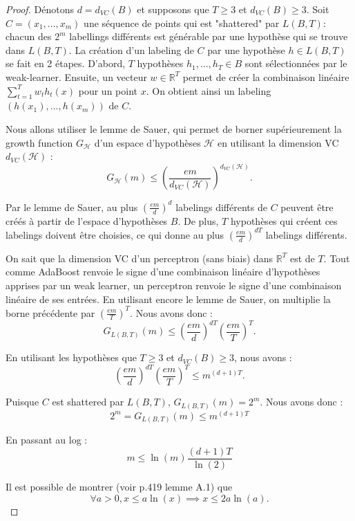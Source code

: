 \documentclass[12pt]{article}
\newcommand{\R}{\mathbb{R}}
\begin{document}
	\begin{proof}
	
	Dénotons $d = d_{VC}(B)$ et supposons que $T \geq 3$ et $d_{VC}(B) \geq 3$.
	Soit $C = (x_1, ..., x_m)$ une séquence de points qui est "shattered" par $L(B, T)$: chacun des $2^m$ labellings différents est générable par une hypothèse qui se trouve dans $L(B, T)$.
	La création d'un labeling de $C$ par une hypothèse $h \in L(B, T)$ se fait en 2 étapes.
	D'abord, $T$ hypothèses $h_1, ..., h_T \in B$ sont sélectionnées par le weak-learner.
	Ensuite, un vecteur $w \in \R^T$ permet de créer la combinaison linéaire $\sum_{t=1}^T w_t h_t(x)$ pour un point $x$.
	On obtient ainsi un labeling $(h(x_1), ..., h(x_m))$ de $C$.
	
	Nous allons utiliser le lemme de Sauer, qui permet de borner supérieurement la growth function $G_{\mathcal{H}}$ d'un espace d'hypothèses $\mathcal{H}$ en utilisant la dimension VC $d_{VC}(\mathcal{H})$ :
	\[
	G_{\mathcal{H}}(m) \leq \left( \frac{em}{d_{VC}(\mathcal{H})} \right) ^{d_{VC}(\mathcal{H})}.
	\]
	
	Par le lemme de Sauer, au plus $\left( \frac{em}{d} \right)^{d}$ labelings différents de $C$ peuvent être créés à partir de l'espace d'hypothèses $B$.
	De plus, $T$ hypothèses qui créent ces labelings doivent être choisies, ce qui donne au plus $\left( \frac{em}{d} \right) ^{d T}$ labelings différents.
	
	On sait que la dimension VC d'un perceptron (sans biais) dans $\R^T$ est de $T$.
	Tout comme AdaBoost renvoie le signe d'une combinaison linéaire d'hypothèses apprises par un weak learner, un perceptron renvoie le signe d'une combinaison linéaire de ses entrées.
	En utilisant encore le lemme de Sauer, on multiplie la borne précédente par $\left( \frac{em}{T} \right)^{T}$.
	Nous avons donc :
	\[
	G_{L(B, T)}(m) \leq \left( \frac{em}{d} \right) ^{d T} \left( \frac{em}{T} \right)^{T}.
	\]
	
	En utilisant les hypothèses que $T \geq 3$ et $d_{VC}(B) \geq 3$, nous avons :
	\[
	\left( \frac{em}{d} \right) ^{d T} \left( \frac{em}{T} \right)^{T} \leq m^{(d + 1) T}.
	\]
	
	Puisque $C$ est shattered par $L(B, T)$, $G_{L(B, T)}(m) = 2^m$.
	Nous avons donc :
	\[
	2^m = G_{L(B, T)}(m) \leq m^{(d + 1) T}
	\]
	
	En passant au log :
	\[
	m \leq \ln(m) \frac{(d + 1) T}{\ln(2)}
	\]
	
	Il est possible de montrer (voir \cite{Shalev-Shwartz2014-ba} p.419 lemme A.1) que
	\[
	\forall a > 0, x \leq a \ln(x) \implies x \leq 2 a \ln(a).
	\]
	

\end{proof}
\end{document}
